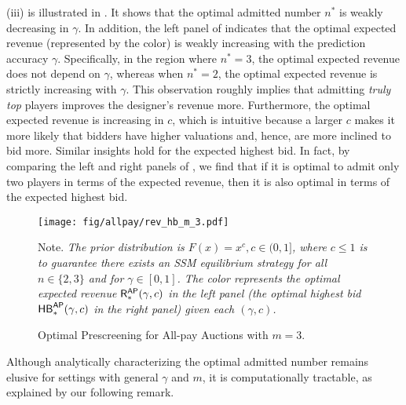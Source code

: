  (iii) is illustrated in . It shows that the optimal admitted number $n^\ast$ is weakly decreasing in $\gamma$. In addition, the left panel of  indicates that the optimal expected revenue (represented by the color) is weakly increasing with the prediction accuracy $\gamma$. Specifically, in the region where $n^\ast=3$, the optimal expected revenue does not depend on $\gamma$, whereas when $n^\ast=2$, the optimal expected revenue is strictly increasing with $\gamma$. This observation roughly implies that admitting \textit{truly top} players improves the designer's revenue more. Furthermore, the optimal expected revenue is increasing in $c$, which is intuitive because a larger $c$ makes it more likely that bidders have higher valuations and, hence, are more inclined to bid more. Similar insights hold for the expected highest bid. In fact, by comparing the left and right panels of , we find that if it is optimal to admit only two players in terms of the expected revenue, then it is also optimal in terms of the expected highest bid.





\begin{figure}[ht]
    \centering
 \texttt{[image: fig/allpay/rev\_hb\_m\_3.pdf]}
    \caption{Optimal Prescreening for All-pay Auctions with $m=3$. 
    }
    \label{fig:m_3_allpay}
    \vspace{0.5em}
        Note.\textit{ The prior distribution is $F(x)=x^c,c\in(0,1]$, where $c\leq 1$ is to guarantee there exists an SSM equilibrium strategy for all $n\in\{2,3\}$ and for {} $\gamma\in[0,1]$.
    The color represents the optimal expected revenue $\mathsf{R}_\ast^{\mathsf{AP}}(\gamma,c)$ in the left panel (the optimal highest bid $\mathsf{HB}_\ast^{\mathsf{AP}}(\gamma,c)$ in the right panel) given each $(\gamma,c)$.}
\end{figure}





Although analytically characterizing the optimal admitted number remains elusive for settings with general $\gamma$ and $m$, it is computationally tractable, as explained by our following remark.


